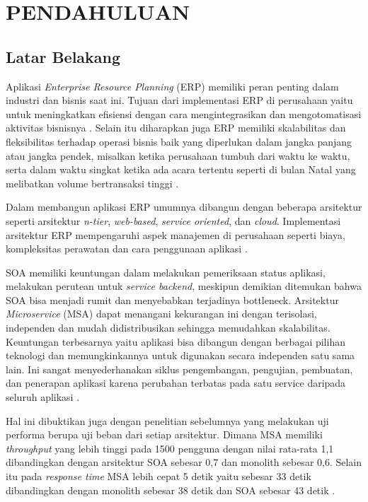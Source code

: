 \chapter{PENDAHULUAN}
\section{Latar Belakang}
Aplikasi \textit{Enterprise Resource Planning} (ERP) memiliki peran penting dalam industri dan bisnis saat ini. Tujuan dari implementasi ERP di perusahaan yaitu untuk meningkatkan efisiensi dengan cara mengintegrasikan dan mengotomatisasi aktivitas bisnisnya \cite{612}. Selain itu diharapkan juga ERP memiliki skalabilitas dan fleksibilitas terhadap operasi bisnis baik yang diperlukan dalam jangka panjang atau jangka pendek, misalkan ketika perusahaan tumbuh dari waktu ke waktu, serta dalam waktu singkat ketika ada acara tertentu seperti di bulan Natal yang melibatkan volume bertransaksi tinggi \cite{D94}.

Dalam membangun aplikasi ERP umumnya dibangun dengan beberapa arsitektur seperti arsitektur \textit{ n-tier}, \textit{web-based}, \textit{service oriented}, dan \textit{cloud}. Implementasi arsitektur ERP mempengaruhi aspek manajemen di perusahaan seperti biaya, kompleksitas perawatan dan cara penggunaan aplikasi \cite{612}.

SOA memiliki keuntungan dalam melakukan pemeriksaan status aplikasi, melakukan perutean untuk \textit{service backend}, meskipun demikian ditemukan bahwa SOA bisa menjadi rumit dan menyebabkan terjadinya bottleneck. Arsitektur \textit{Microservice} (MSA) dapat menangani kekurangan ini dengan terisolasi, independen dan mudah didistribusikan sehingga memudahkan skalabilitas. Keuntungan terbesarnya yaitu aplikasi bisa dibangun dengan berbagai pilihan teknologi dan memungkinkannya untuk digunakan secara independen satu sama lain. Ini sangat menyederhanakan siklus pengembangan, pengujian, pembuatan, dan penerapan aplikasi karena perubahan terbatas pada satu service daripada seluruh aplikasi \cite{6C1}.

Hal ini dibuktikan juga dengan penelitian sebelumnya yang melakukan uji performa berupa uji beban dari setiap arsitektur. Dimana MSA memiliki \textit{throughput} yang lebih tinggi pada 1500 pengguna dengan nilai rata-rata 1,1 dibandingkan dengan arsitektur SOA sebesar 0,7 dan monolith sebesar 0,6. Selain itu pada \textit{response time} MSA lebih cepat 5 detik yaitu sebesar 33 detik dibandingkan dengan monolith sebesar 38 detik dan SOA sebesar 43 detik \cite{5FA}.

